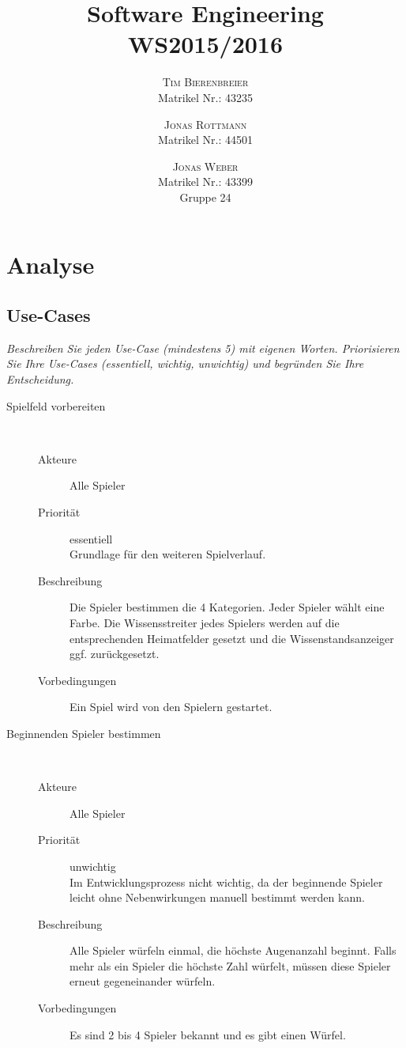 \documentclass{report}
\title{Software Engineering\\\small{WS2015/2016}}
\author{
	\textsc{Tim Bierenbreier}\\
	\normalsize Matrikel Nr.: 43235
	\and
	\textsc{Jonas Rottmann}\\
	\normalsize Matrikel Nr.: 44501
	\and
	\textsc{Jonas Weber}\\
	\normalsize Matrikel Nr.: 43399 \\[2cm]
	{\Huge Gruppe 24} \\[2cm]
}
\begin{document}
\maketitle

\tableofcontents

\chapter{Analyse}
\section{Use-Cases}
\textit{Beschreiben Sie jeden Use-Case (mindestens 5) mit eigenen Worten. Priorisieren Sie Ihre Use-Cases (essentiell, wichtig, unwichtig) und begr\"unden Sie Ihre Entscheidung.}
\begin{description}
   \item[Spielfeld vorbereiten]~\par
   \begin{description}
      \item[Akteure] Alle Spieler
      \item[Priorität] essentiell\\Grundlage für den weiteren Spielverlauf.
      \item[Beschreibung] Die Spieler bestimmen die 4 Kategorien. Jeder Spieler wählt eine Farbe. Die Wissensstreiter jedes Spielers werden auf die entsprechenden Heimatfelder gesetzt und die Wissenstandsanzeiger ggf. zurückgesetzt.
      \item[Vorbedingungen] Ein Spiel wird von den Spielern gestartet.
   \end{description}


   \item[Beginnenden Spieler bestimmen]~\par
   \begin{description}
      \item[Akteure] Alle Spieler
      \item[Priorität] unwichtig\\Im Entwicklungsprozess nicht wichtig, da der beginnende Spieler leicht ohne Nebenwirkungen manuell bestimmt werden kann.
      \item[Beschreibung] Alle Spieler würfeln einmal, die höchste Augenanzahl beginnt. Falls mehr als ein Spieler die höchste Zahl würfelt, müssen diese Spieler erneut gegeneinander würfeln.
      \item[Vorbedingungen] Es sind 2 bis 4 Spieler bekannt und es gibt einen Würfel.
   \end{description}



\end{description}
\end{document}
